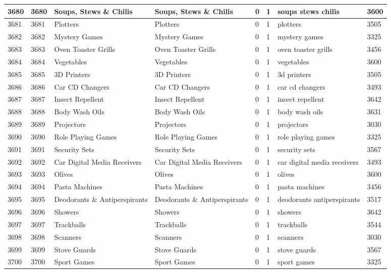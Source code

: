 \begin{longtable}{|l|l|l|l|l|l|l|l|}
3680 & 3680 & Soups, Stews \& Chilis & Soups, Stews \& Chilis & 0 & 1 & soups stews chilis & 3600 \\ \hline 
3681 & 3681 & Plotters & Plotters & 0 & 1 & plotters & 3505 \\ \hline 
3682 & 3682 & Mystery Games & Mystery Games & 0 & 1 & mystery games & 3325 \\ \hline 
3683 & 3683 & Oven Toaster Grills & Oven Toaster Grills & 0 & 1 & oven toaster grills & 3456 \\ \hline 
3684 & 3684 & Vegetables & Vegetables & 0 & 1 & vegetables & 3600 \\ \hline 
3685 & 3685 & 3D Printers & 3D Printers & 0 & 1 & 3d printers & 3505 \\ \hline 
3686 & 3686 & Car CD Changers & Car CD Changers & 0 & 1 & car cd changers & 3493 \\ \hline 
3687 & 3687 & Insect Repellent & Insect Repellent & 0 & 1 & insect repellent & 3642 \\ \hline 
3688 & 3688 & Body Wash Oils & Body Wash Oils & 0 & 1 & body wash oils & 3631 \\ \hline 
3689 & 3689 & Projectors & Projectors & 0 & 1 & projectors & 3030 \\ \hline 
3690 & 3690 & Role Playing Games & Role Playing Games & 0 & 1 & role playing games & 3325 \\ \hline 
3691 & 3691 & Security Sets & Security Sets & 0 & 1 & security sets & 3567 \\ \hline 
3692 & 3692 & Car Digital Media Receivers & Car Digital Media Receivers & 0 & 1 & car digital media receivers & 3493 \\ \hline 
3693 & 3693 & Olives & Olives & 0 & 1 & olives & 3600 \\ \hline 
3694 & 3694 & Pasta Machines & Pasta Machines & 0 & 1 & pasta machines & 3456 \\ \hline 
3695 & 3695 & Deodorants \& Antiperspirants & Deodorants \& Antiperspirants & 0 & 1 & deodorants antiperspirants & 3517 \\ \hline 
3696 & 3696 & Showers & Showers & 0 & 1 & showers & 3642 \\ \hline 
3697 & 3697 & Trackballs & Trackballs & 0 & 1 & trackballs & 3544 \\ \hline 
3698 & 3698 & Scanners & Scanners & 0 & 1 & scanners & 3030 \\ \hline 
3699 & 3699 & Stove Guards & Stove Guards & 0 & 1 & stove guards & 3567 \\ \hline 
3700 & 3700 & Sport Games & Sport Games & 0 & 1 & sport games & 3325 \\ \hline 

\end{longtable}
